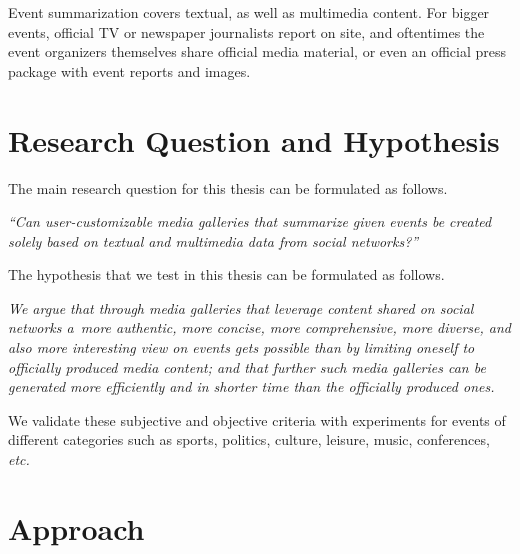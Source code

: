 Event summarization covers textual,
as well as multimedia content.
For bigger events, official TV or newspaper journalists
report on site, and oftentimes the event organizers themselves
share official media material,
or even an official press package with event reports and images.

\section{Research Question and Hypothesis}

The main research question for this thesis
can be formulated as follows.
 
\noindent \textit{``Can user-customizable
media galleries that summarize given events be
created solely based on textual and multimedia data
from social networks?''}

\noindent The hypothesis that we test in this thesis
can be formulated as follows.

\noindent \textit{We argue that
through media galleries that leverage content
shared on social networks
a~more \emph{authentic}, more \emph{concise},
more \emph{comprehensive}, more \emph{diverse},
and also more \emph{interesting}
view on events gets possible than by limiting oneself
to officially produced media content;
and that further such media galleries can be generated
more \emph{efficiently} and \emph{in shorter time}
than the officially produced ones.}

\noindent We validate these subjective and objective
criteria with experiments for events of different categories
such as sports, politics, culture, leisure,
music, conferences, \emph{etc.}

\section{Approach}

